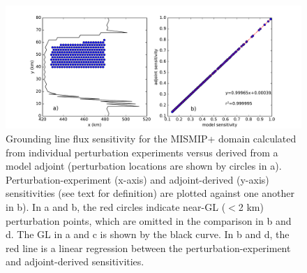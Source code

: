 \documentclass[review,oneside]{igs}
\begin{document}
\begin{figure}
	\centering
    \includegraphics[width=1\linewidth]{figs/adjoint_comp.pdf}
    \caption{Grounding line flux sensitivity for the MISMIP+ domain calculated from individual perturbation experiments versus derived from a model adjoint (perturbation locations are shown by circles in a). Perturbation-experiment (x-axis) and adjoint-derived (y-axis) sensitivities (see text for definition) are plotted against one another in b). In a and b, the red circles indicate near-GL ($<$2 km) perturbation points, which are omitted in the comparison in b and d. The GL in a and c is shown by the black curve. In b and d, the red line is a linear regression between the perturbation-experiment and adjoint-derived sensitivities.}
	\label{adjoint_comp}
\end{figure}




\end{document}
